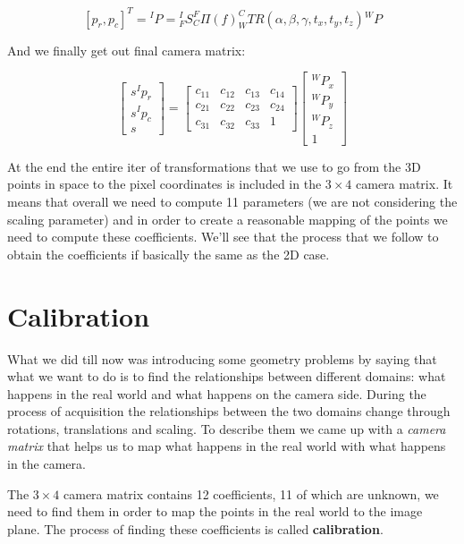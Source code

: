 \[
  [p_r, p_c]^T = {}^IP = {}^I_F S^F_C \varPi (f)^C_W TR(\alpha, \beta, \gamma, t_x, t_y, t_z) {}^WP
\]

And we finally get out final camera matrix:

\[
    \begin{bmatrix}
        s^Ip_r \\
        s^Ip_c \\
        s
    \end{bmatrix}
    = 
    \begin{bmatrix}
        c_{11} & c_{12} & c_{13} & c_{14} \\
        c_{21} & c_{22} & c_{23} & c_{24} \\
        c_{31} & c_{32} & c_{33} & 1
    \end{bmatrix}
    \begin{bmatrix}
        {}^WP_x \\
        {}^WP_y \\
        {}^WP_z \\
        1
    \end{bmatrix}
\]

At the end the entire iter of transformations that we use to go from the 3D points in space to the pixel coordinates is included in the $3 \times 4$ camera matrix. It means that overall we need to compute 11 parameters (we are not considering the scaling parameter) and in order to create a reasonable mapping of the points we need to compute these coefficients. We'll see that the process that we follow to obtain the coefficients if basically the same as the 2D case.

\section{Calibration}

What we did till now was introducing some geometry problems by saying that what we want to do is to find the relationships between different domains: what happens in the real world and what happens on the camera side. During the process of acquisition the relationships between the two domains change through rotations, translations and scaling. To describe them we came up with a \textit{camera matrix} that helps us to map what happens in the real world with what happens in the camera.

The \(3 \times 4\) camera matrix contains 12 coefficients, 11 of which are unknown, we need to find them in order to map the points in the real world to the image plane. The process of finding these coefficients is called \textbf{calibration}.

